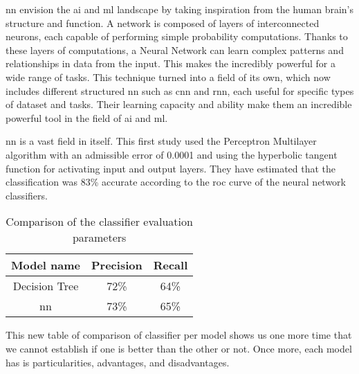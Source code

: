 \documentclass[../../../main.tex]{subfiles}
\begin{document}
\acrfull{nn} envision the \acrfull{ai} and \acrshort{ml} landscape by taking inspiration from the human brain's structure and function. A network is composed of layers of interconnected neurons, each capable of performing simple probability computations. Thanks to these layers of computations, a Neural Network can learn complex patterns and relationships in data from the input. This makes the incredibly powerful for a wide range of tasks. 
This technique turned into a field of its own, which now includes different structured \acrfull{nn} such as \acrfull{cnn} and \acrfull{rnn}, each useful for specific types of dataset and tasks. Their learning capacity and ability make them an incredible powerful tool in the field of \acrshort{ai} and \acrshort{ml}. 

\acrfull{nn} is a vast field in itself. This first study used the Perceptron Multilayer algorithm with an admissible error of 0.0001 and using the hyperbolic tangent function for activating input and output layers\cite{viloria_integration_2019}. They have estimated that the classification was 83\% accurate according to the \acrshort{roc} curve of the neural network classifiers.
\begin{table}[H]
    \centering
    \caption{Comparison of the classifier evaluation parameters\cite{viloria_integration_2019}}
    \begin{tabular}{|c|c|c|}
        \hline
        \textbf{Model name} & \textbf{Precision}  & \textbf{Recall}\\
        \hline
        Decision Tree & 72\% & 64\% \\
        \hline
        \acrlong{nn} & 73\% & 65\% \\
        \hline
    \end{tabular}
    \label{tab:comparaison_classifier_eval_param_viloria}
\end{table}

This new table of comparison of classifier per model shows us one more time that we cannot establish if one is better than the other or not. Once more, each model has is particularities, advantages, and disadvantages. 
\end{document}
